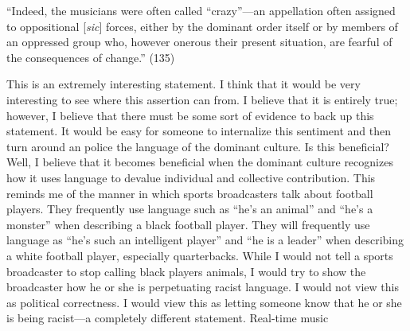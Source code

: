 \documentclass[12pt]{article}
\begin{document}
``Indeed, the musicians were often called ``crazy''---an appellation often assigned to oppositional [\emph{sic}] forces, either by the dominant order itself or by members of an oppressed group who, however onerous their present situation, are fearful of the consequences of change.'' (135)

This is an extremely interesting statement. I think that it would be very interesting to see where this assertion can from. I believe that it is entirely true; however, I believe that there must be some sort of evidence to back up this statement. It would be easy for someone to internalize this sentiment and then turn around an police the language of the dominant culture. Is this beneficial? Well, I believe that it becomes beneficial when the dominant culture recognizes how it uses language to devalue individual and collective contribution. This reminds me of the manner in which sports broadcasters talk about football players. They frequently use language such as ``he's an animal'' and ``he's a monster'' when describing a black football player. They will frequently use language as ``he's such an intelligent player'' and ``he is a leader'' when describing a white football player, especially quarterbacks. While I would not tell a sports broadcaster to stop calling black players animals, I would try to show the broadcaster how he or she is perpetuating racist language. I would not view this as political correctness. I would view this as letting someone know that he or she is being racist---a completely different statement.
Real-time music
\end{document}
